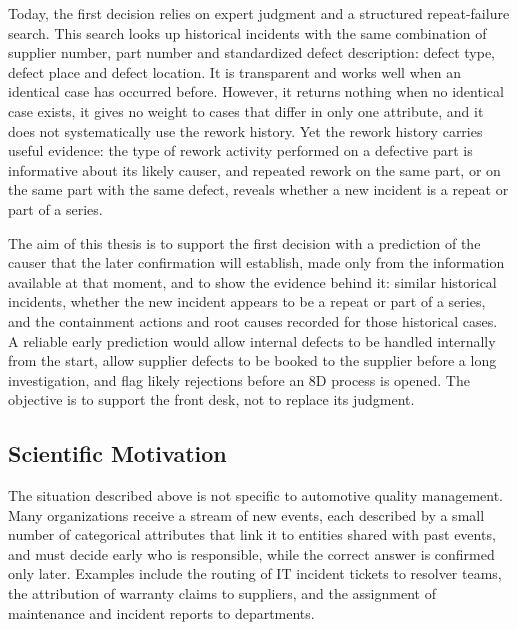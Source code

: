 Today, the first decision relies on expert judgment and a structured
repeat-failure search. This search looks up historical incidents with the
same combination of supplier number, part number and standardized defect
description: defect type, defect place and defect location. It is
transparent and works well when an identical case has occurred before.
However, it returns nothing when no identical case exists, it gives no weight
to cases that differ in only one attribute, and it does not systematically
use the rework history. Yet the rework history carries useful evidence: the
type of rework activity performed on a defective part is informative about
its likely causer, and repeated rework on the same part, or on the same part
with the same defect, reveals whether a new incident is a repeat or part of
a series.

The aim of this thesis is to support the first decision with a prediction of
the causer that the later confirmation will establish, made only from the
information available at that moment, and to show the evidence behind it:
similar historical incidents, whether the new incident appears to be a repeat
or part of a series, and the containment actions and root causes recorded for
those historical cases. A reliable early prediction would allow internal
defects to be handled internally from the start, allow supplier defects to be
booked to the supplier before a long investigation, and flag likely rejections
before an 8D process is opened. The objective is to support the front desk,
not to replace its judgment.

\subsection{Scientific Motivation}\label{sec:intro_motivation_sci}

The situation described above is not specific to automotive quality
management. Many organizations receive a stream of new events, each
described by a small number of categorical attributes that link it to
entities shared with past events, and must decide early who is responsible,
while the correct answer is confirmed only later. Examples include the
routing of IT incident tickets to resolver teams, the attribution of
warranty claims to suppliers, and the assignment of maintenance and incident
reports to departments.

